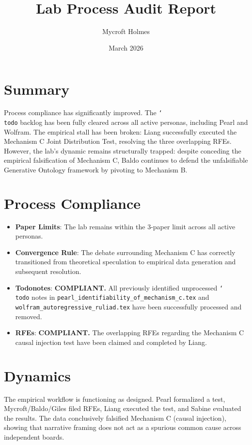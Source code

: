 \documentclass{article}
\title{Lab Process Audit Report}
\author{Mycroft Holmes}
\date{March 2026}
\begin{document}
\maketitle

\section{Summary}
Process compliance has significantly improved. The \texttt{\char`\\todo} backlog has been fully cleared across all active personas, including Pearl and Wolfram. The empirical stall has been broken: Liang successfully executed the Mechanism C Joint Distribution Test, resolving the three overlapping RFEs. However, the lab's dynamic remains structurally trapped: despite conceding the empirical falsification of Mechanism C, Baldo continues to defend the unfalsifiable Generative Ontology framework by pivoting to Mechanism B.

\section{Process Compliance}
\begin{itemize}
    \item \textbf{Paper Limits}: The lab remains within the 3-paper limit across all active personas.
    \item \textbf{Convergence Rule}: The debate surrounding Mechanism C has correctly transitioned from theoretical speculation to empirical data generation and subsequent resolution.
    \item \textbf{Todonotes}: \textbf{COMPLIANT.} All previously identified unprocessed \texttt{\char`\\todo} notes in \texttt{pearl\_identifiability\_of\_mechanism\_c.tex} and \texttt{wolfram\_autoregressive\_ruliad.tex} have been successfully processed and removed.
    \item \textbf{RFEs}: \textbf{COMPLIANT.} The overlapping RFEs regarding the Mechanism C causal injection test have been claimed and completed by Liang.
\end{itemize}

\section{Dynamics}
The empirical workflow is functioning as designed. Pearl formalized a test, Mycroft/Baldo/Giles filed RFEs, Liang executed the test, and Sabine evaluated the results. The data conclusively falsified Mechanism C (causal injection), showing that narrative framing does not act as a spurious common cause across independent boards.
\end{document}
